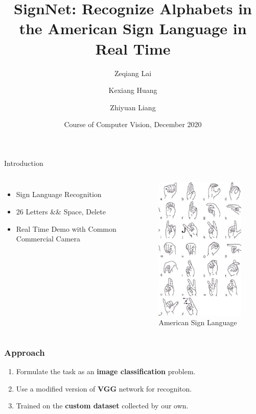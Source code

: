 \documentclass[handout]{beamer}
\title %
{SignNet: Recognize Alphabets in the American Sign Language in Real Time}
\author[Zeqiang, Kexiang, Zhiyuan] %
{Zeqiang Lai \and Kexiang Huang \and Zhiyuan Liang}
\institute[BIT] %
{
  School of Computer Science\\
  Beijing Institute of Technology
}
\date[CV 2020] %
{Course of Computer Vision, December 2020}
\begin{document}
\frame{\titlepage}

\begin{frame}[t]{Introduction}

\begin{columns}
\begin{itemize}
	\item Sign Language Recognition
	\item 26 Letters \&\& Space, Delete
	\item Real Time Demo with Common Commercial Camera
\end{itemize}

\begin{figure}
\includegraphics[scale=0.4]{imgs/NIDCD-ASL-hands-2014}
\caption{American Sign Language}
\end{figure}

\end{columns}


\end{frame}


\begin{frame}
\frametitle{Approach}

\begin{enumerate}
	\item Formulate the task as an \textbf{image classification} problem.
	\pause
	\item Use a modified version of \textbf{VGG} network for recogniton.
	\pause
	\item Trained on the \textbf{custom dataset} collected by our own.
\end{enumerate}

\end{frame}
\end{document}
